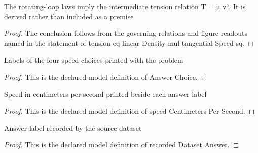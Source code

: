 \begin{lemma}
  \label{lem:physics:phyx-mini-0306:phyxminiproblems-problemphyxmini0306-tension-eq-lineardensity-mul-tangentialspeed-sq}
  The rotating-loop laws imply the intermediate tension relation T = μ v². It is derived rather than included as a premise
\end{lemma}
\begin{proof}
  The conclusion follows from the governing relations and figure readouts named in the statement of tension eq linear Density mul tangential Speed sq.
\end{proof}
\begin{definition}
  \label{def:physics:phyx-mini-0306:phyxminiproblems-problemphyxmini0306-answerchoice}
  Labels of the four speed choices printed with the problem
\end{definition}
\begin{proof}
  This is the declared model definition of Answer Choice.
\end{proof}
\begin{definition}
  \label{def:physics:phyx-mini-0306:phyxminiproblems-problemphyxmini0306-answerchoice-speedcentimeterspersecond}
  Speed in centimeters per second printed beside each answer label
\end{definition}
\begin{proof}
  This is the declared model definition of speed Centimeters Per Second.
\end{proof}
\begin{definition}
  \label{def:physics:phyx-mini-0306:phyxminiproblems-problemphyxmini0306-recordeddatasetanswer}
  Answer label recorded by the source dataset
\end{definition}
\begin{proof}
  This is the declared model definition of recorded Dataset Answer.
\end{proof}
